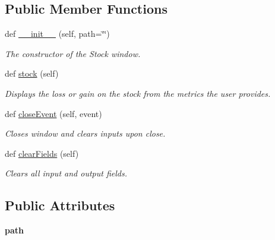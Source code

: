 \subsection*{Public Member Functions}
\begin{DoxyCompactItemize}
\item 
def \hyperlink{classstock__ui_1_1_stock_window_a7347eaa350a1387847c614c65ef35718}{\+\_\+\+\_\+init\+\_\+\+\_\+} (self, path=\char`\"{}\char`\"{})
\begin{DoxyCompactList}\small\item\em The constructor of the Stock window. \end{DoxyCompactList}\item 
def \hyperlink{classstock__ui_1_1_stock_window_a81a932663d0fdf4674729367ce8f5d4e}{stock} (self)
\begin{DoxyCompactList}\small\item\em Displays the loss or gain on the stock from the metrics the user provides. \end{DoxyCompactList}\item 
\mbox{\label{classstock__ui_1_1_stock_window_a569041143a53dbf33054a443a23439c0}} 
def \hyperlink{classstock__ui_1_1_stock_window_a569041143a53dbf33054a443a23439c0}{close\+Event} (self, event)
\begin{DoxyCompactList}\small\item\em Closes window and clears inputs upon close. \end{DoxyCompactList}\item 
\mbox{\label{classstock__ui_1_1_stock_window_aeccf3153f98b2301f62f9ca3b071cab1}} 
def \hyperlink{classstock__ui_1_1_stock_window_aeccf3153f98b2301f62f9ca3b071cab1}{clear\+Fields} (self)
\begin{DoxyCompactList}\small\item\em Clears all input and output fields. \end{DoxyCompactList}\end{DoxyCompactItemize}
\subsection*{Public Attributes}
\begin{DoxyCompactItemize}
\item 
\mbox{\label{classstock__ui_1_1_stock_window_a799b895206dbff001bcc12929d0af1ce}} 
{\bfseries path}
\end{DoxyCompactItemize}


